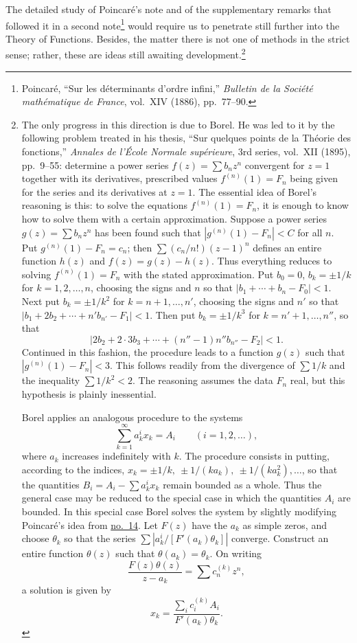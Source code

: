 \documentclass[
  paper=b5,
  fontsize=13pt,
  twoside=true,
  open=any,
  bookmarkpackage=false,
  chapterprefix=true,
  headings=normal
]{scrbook}
\theoremstyle{definition}
\begin{document}
The detailed study of Poincar\'e's note and of the supplementary remarks that followed it in a second note\footnote{Poincar\'e, ``Sur les d\'eterminants d'ordre infini,'' \emph{Bulletin de la Soci\'et\'e math\'ematique de France}, vol.~XIV (1886), pp.~77--90.} would require us to penetrate still further into the Theory of Functions. Besides, the matter there is not one of methods in the strict sense; rather, these are ideas still awaiting development.\footnote{The only progress in this direction is due to Borel. He was led to it by the following problem treated in his thesis, ``Sur quelques points de la Th\'eorie des fonctions,'' \emph{Annales de l'\'Ecole Normale sup\'erieure}, 3rd series, vol.~XII (1895), pp.~9--55: determine a power series $f(z)=\sum b_nz^n$ convergent for $z=1$ together with its derivatives, prescribed values $f^{(n)}(1)=F_n$ being given for the series and its derivatives at $z=1$. The essential idea of Borel's reasoning is this: to solve the equations $f^{(n)}(1)=F_n$, it is enough to know how to solve them with a certain approximation. Suppose a power series $g(z)=\sum b_nz^n$ has been found such that $|g^{(n)}(1)-F_n|<C$ for all $n$. Put $g^{(n)}(1)-F_n=c_n$; then $\sum(c_n/n!)(z-1)^n$ defines an entire function $h(z)$ and $f(z)=g(z)-h(z)$. Thus everything reduces to solving $f^{(n)}(1)=F_n$ with the stated approximation. Put $b_0=0$, $b_k=\pm1/k$ for $k=1,2,\ldots,n$, choosing the signs and $n$ so that $|b_1+\cdots+b_n-F_0|<1$. Next put $b_k=\pm1/k^2$ for $k=n+1,\ldots,n'$, choosing the signs and $n'$ so that $|b_1+2b_2+\cdots+n'b_{n'}-F_1|<1$. Then put $b_k=\pm1/k^3$ for $k=n'+1,\ldots,n''$, so that
\[
 |2b_2+2\cdot3b_3+\cdots+(n''-1)n''b_{n''}-F_2|<1.
\]
Continued in this fashion, the procedure leads to a function $g(z)$ such that $|g^{(n)}(1)-F_n|<3$. This follows readily from the divergence of $\sum1/k$ and the inequality $\sum1/k^2<2$. The reasoning assumes the data $F_n$ real, but this hypothesis is plainly inessential.

Borel applies an analogous procedure to the systems
\[
 \sum_{k=1}^{\infty}a_k^i x_k=A_i\qquad(i=1,2,\ldots),
\]
where $a_k$ increases indefinitely with $k$. The procedure consists in putting, according to the indices, $x_k=\pm1/k,\ \pm1/(ka_k),\ \pm1/(ka_k^2),\ldots$, so that the quantities $B_i=A_i-\sum a_k^i x_k$ remain bounded as a whole. Thus the general case may be reduced to the special case in which the quantities $A_i$ are bounded. In this special case Borel solves the system by slightly modifying Poincar\'e's idea from \hyperref[sec:14]{no.~14}. Let $F(z)$ have the $a_k$ as simple zeros, and choose $\theta_k$ so that the series $\sum|a_k^i/[F'(a_k)\theta_k]|$ converge. Construct an entire function $\theta(z)$ such that $\theta(a_k)=\theta_k$. On writing
\[
 \frac{F(z)\theta(z)}{z-a_k}=\sum c_n^{(k)}z^n,
\]
a solution is given by
\[
 x_k=\frac{\sum_i c_i^{(k)}A_i}{F'(a_k)\theta_k}.
\]}
\endgroup
\footnotetext{\fontsize{9pt}{9.8pt}\selectfont\BorelLongNote}
\end{document}
